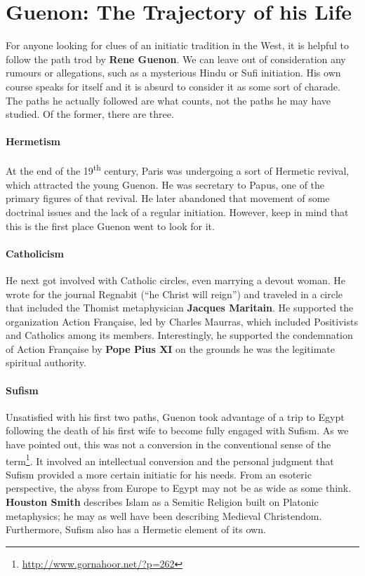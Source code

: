 \section{Guenon: The Trajectory of his Life}

For anyone looking for clues of an initiatic tradition in the West, it is helpful to follow the path trod by \textbf{Rene Guenon}. We can leave out of consideration any rumours or allegations, such as a mysterious Hindu or Sufi initiation. His own course speaks for itself and it is absurd to consider it as some sort of charade. The paths he actually followed are what counts, not the paths he may have studied. Of the former, there are three.

\paragraph{Hermetism}

At the end of the 19\textsuperscript{th} century, Paris was undergoing a sort of Hermetic revival, which attracted the young Guenon. He was secretary to Papus, one of the primary figures of that revival. He later abandoned that movement of some doctrinal issues and the lack of a regular initiation. However, keep in mind that this is the first place Guenon went to look for it.

\paragraph{Catholicism}


He next got involved with Catholic circles, even marrying a devout woman. He wrote for the journal Regnabit (``he Christ will reign'') and traveled in a circle that included the Thomist metaphysician \textbf{Jacques Maritain}. He supported the organization Action Française, led by Charles Maurras, which included Positivists and Catholics among its members. Interestingly, he supported the condemnation of Action Française by \textbf{Pope Pius XI} on the grounds he was the legitimate spiritual authority.

\paragraph{Sufism}


Unsatisfied with his first two paths, Guenon took advantage of a trip to Egypt following the death of his first wife to become fully engaged with Sufism. As we have pointed out, this was not a conversion in the conventional sense of the term\footnote{\url{http://www.gornahoor.net/?p=262}}. It involved an intellectual conversion and the personal judgment that Sufism provided a more certain initiatic for his needs. From an esoteric perspective, the abyss from Europe to Egypt may not be as wide as some think. \textbf{Houston Smith} describes Islam as a Semitic Religion built on Platonic metaphysics; he may as well have been describing Medieval Christendom. Furthermore, Sufism also has a Hermetic element of its own.

